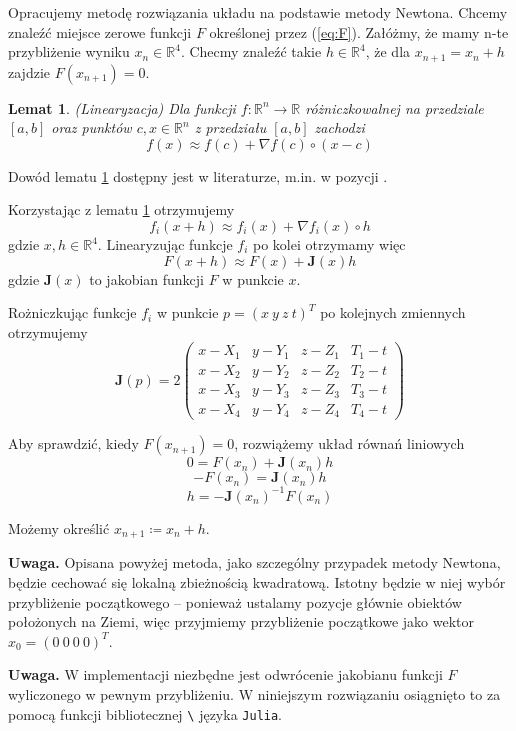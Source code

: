 \documentclass{article}
\newtheorem{lemma}{Lemat}
\begin{document}
Opracujemy metodę rozwiązania układu na podstawie metody Newtona. Chcemy znaleźć miejsce zerowe funkcji
$F$ określonej przez (\ref{eq:F}). Załóżmy, że mamy n-te przybliżenie wyniku $x_n \in \mathbb{R}^4$.
Checmy znaleźć takie $h \in \mathbb{R}^4$, że dla $x_{n+1} = x_n + h$ zajdzie $F(x_{n+1}) = 0$.

\begin{lemma}(Linearyzacja) \label{th:linearize}
    Dla funkcji $f: \mathbb{R}^n \rightarrow \mathbb{R}$ różniczkowalnej na przedziale $[a, b]$
    oraz punktów $c, x \in \mathbb{R}^n$ z przedziału $[a, b]$ zachodzi
    \[
        f(x) \approx f(c) + \nabla f(c) \circ (x - c)
    \]
\end{lemma}
Dowód lematu \ref{th:linearize} dostępny jest w literaturze, m.in. w pozycji \cite{linearize}.

Korzystając z lematu \ref{th:linearize} otrzymujemy
\[
f_i(x+h) \approx f_i(x) + \nabla f_i(x) \circ h
\]
gdzie $x, h \in \mathbb{R}^4$.
Linearyzując funkcje $f_i$ po kolei otrzymamy więc
\[
F(x+h) \approx F(x) + \mathbf{J}(x)h
\]
gdzie $\mathbf{J}(x)$ to jakobian funkcji $F$ w punkcie $x$.

Rożniczkując funkcje $f_i$ w punkcie $p=(x \ y \ z \ t)^T$ po kolejnych zmiennych otrzymujemy
\[
\label{eq:jacobian}
\mathbf{J}(p) = 2
\begin{pmatrix}
    x-X_1  & y-Y_1 & z-Z_1 & T_1-t \\
    x-X_2  & y-Y_2 & z-Z_2 & T_2-t \\
    x-X_3  & y-Y_3 & z-Z_3 & T_3-t \\
    x-X_4  & y-Y_4 & z-Z_4 & T_4-t
\end{pmatrix}
\]

Aby sprawdzić, kiedy $F(x_{n+1}) = 0$, rozwiążemy układ równań liniowych
$$0 = F(x_n) + \mathbf{J}(x_n)h $$
$$-F(x_n) = \mathbf{J}(x_n)h $$
$$h = -\mathbf{J}(x_n)^{-1}F(x_n)$$

Możemy określić $x_{n+1} \coloneqq x_n + h$.

\textbf{Uwaga.} \enspace Opisana powyżej metoda, jako szczególny przypadek metody Newtona, będzie cechować
się lokalną zbieżnością kwadratową. Istotny będzie w niej wybór przybliżenie początkowego -- ponieważ ustalamy
pozycje głównie obiektów położonych na Ziemi, więc przyjmiemy przybliżenie początkowe jako wektor $x_0 = (0 \ 0 \ 0 \ 0)^T$.

\textbf{Uwaga.} \enspace W implementacji niezbędne jest odwrócenie jakobianu funkcji $F$ wyliczonego w
pewnym przybliżeniu. W niniejszym rozwiązaniu osiągnięto to za pomocą funkcji bibliotecznej \texttt{\textbackslash}
języka \texttt{Julia}.
\end{document}
